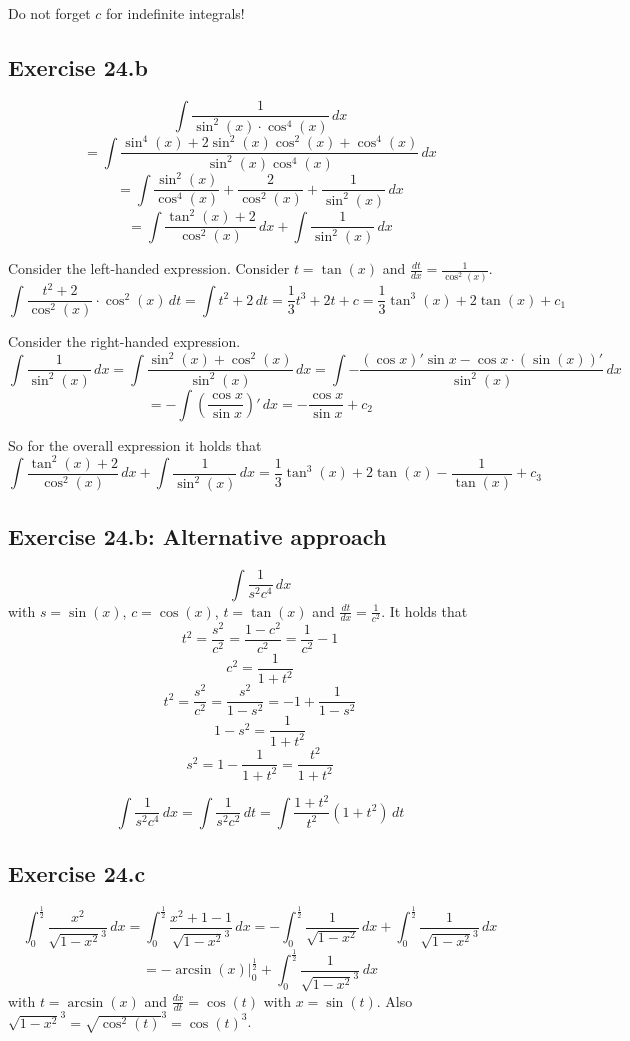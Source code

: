 \documentclass[a4paper]{article}
\theoremstyle{definition}
\begin{document}
Do not forget $c$ for indefinite integrals!

\subsection{Exercise 24.b}
\[
  \int \frac{1}{\sin^2(x) \cdot \cos^4(x)} \, dx
\] \[
  = \int \frac{\sin^4(x) + 2 \sin^2(x) \cos^2(x) + \cos^4(x)}{\sin^2(x) \cos^4(x)} \, dx
\] \[
  = \int \frac{\sin^2(x)}{\cos^4(x)} + \frac{2}{\cos^2(x)} + \frac{1}{\sin^2(x)} \, dx
\] \[
  = \int \frac{\tan^2(x) + 2}{\cos^2(x)} \, dx + \int \frac{1}{\sin^2(x)} \, dx
\]

Consider the left-handed expression.
Consider $t = \tan(x)$ and $\frac{dt}{dx} = \frac{1}{\cos^2(x)}$.
\[
  \int \frac{t^2 + 2}{\cos^2(x)} \cdot \cos^2(x) \, dt
    = \int t^2  + 2 \, dt = \frac13 t^3 + 2t + c
    = \frac13 \tan^3(x) + 2 \tan(x) + c_1
\]

Consider the right-handed expression.
\[
  \int \frac{1}{\sin^2(x)} \, dx
    = \int \frac{\sin^2(x) + \cos^2(x)}{\sin^2(x)} \, dx
    = \int -\frac{(\cos{x})' \sin{x} - \cos{x} \cdot (\sin(x))'}{\sin^2(x)} \, dx
\] \[
  = -\int \left(\frac{\cos{x}}{\sin{x}}\right)' \, dx = -\frac{\cos{x}}{\sin{x}}  + c_2
\]

So for the overall expression it holds that
\[
  \int \frac{\tan^2(x) + 2}{\cos^2(x)} \, dx + \int \frac{1}{\sin^2(x)} \, dx
  = \frac13 \tan^3(x) + 2\tan(x) - \frac{1}{\tan(x)} + c_3
\]

\subsection{Exercise 24.b: Alternative approach}
\[ \int \frac{1}{s^2 c^4} \, dx \]
with $s = \sin(x)$, $c = \cos(x)$, $t = \tan(x)$ and $\frac{dt}{dx} = \frac{1}{c^2}$.
It holds that
\[
  t^2 = \frac{s^2}{c^2} = \frac{1 - c^2}{c^2} = \frac{1}{c^2} - 1
\] \[
  c^2 = \frac{1}{1 + t^2}
\] \[
  t^2 = \frac{s^2}{c^2} = \frac{s^2}{1 - s^2} = -1 + \frac{1}{1 - s^2}
\] \[
  1 - s^2 = \frac{1}{1 + t^2}
\] \[
  s^2 = 1 - \frac{1}{1 + t^2} = \frac{t^2}{1 + t^2}
\]

\[
  \int \frac{1}{s^2 c^4} \, dx
     = \int \frac{1}{s^2 c^2} \, dt
     = \int \frac{1 + t^2}{t^2}(1 + t^2) \, dt
\]

\subsection{Exercise 24.c}
\[
  \int_0^{\frac12} \frac{x^2}{\sqrt{1 - x^2}^3} \, dx
  = \int_0^{\frac12} \frac{x^2 + 1 - 1}{\sqrt{1 - x^2}^3} \, dx
  = - \int_0^{\frac12} \frac{1}{\sqrt{1 - x^2}} \, dx
  + \int_0^{\frac12} \frac{1}{\sqrt{1 - x^2}^3} \, dx
\]
\[
  = \left. -\arcsin(x) \right|_0^{\frac12}
  + \int_0^{\frac12} \frac{1}{\sqrt{1 - x^2}^3} \, dx
\]
with $t = \arcsin(x)$ and $\frac{dx}{dt} = \cos(t)$ with $x = \sin(t)$.
Also $\sqrt{1 - x^2}^3 = \sqrt{\cos^2(t)}^3 = \cos(t)^3$.
\end{document}
